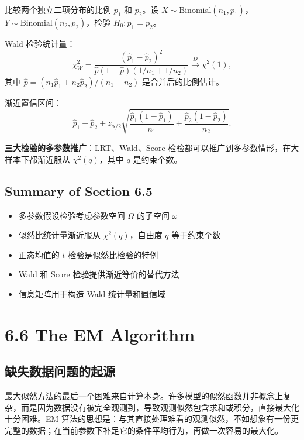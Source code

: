 \begin{example}[二项比例的检验]\label{ex:binomial-proportion-test}
比较两个独立二项分布的比例 $p_1$ 和 $p_2$。设 $X \sim \text{Binomial}(n_1, p_1)$，$Y \sim \text{Binomial}(n_2, p_2)$，检验 $H_0: p_1 = p_2$。

Wald 检验统计量：
\[
\chi_W^2 = \frac{(\widehat{p}_1 - \widehat{p}_2)^2}{\widehat{p}(1-\widehat{p})(1/n_1 + 1/n_2)} \xrightarrow{D} \chi^2(1),
\]
其中 $\widehat{p} = (n_1\widehat{p}_1 + n_2\widehat{p}_2)/(n_1 + n_2)$ 是合并后的比例估计。

渐近置信区间：
\[
\widehat{p}_1 - \widehat{p}_2 \pm z_{\alpha/2}\sqrt{\frac{\widehat{p}_1(1-\widehat{p}_1)}{n_1} + \frac{\widehat{p}_2(1-\widehat{p}_2)}{n_2}}.
\]
\end{example}

\begin{remark}
\textbf{三大检验的多参数推广}：LRT、Wald、Score 检验都可以推广到多参数情形，在大样本下都渐近服从 $\chi^2(q)$，其中 $q$ 是约束个数。
\end{remark}

\subsection{Summary of Section 6.5}

\begin{itemize}
\item 多参数假设检验考虑参数空间 $\Omega$ 的子空间 $\omega$
\item 似然比统计量渐近服从 $\chi^2(q)$，自由度 $q$ 等于约束个数
\item 正态均值的 $t$ 检验是似然比检验的特例
\item Wald 和 Score 检验提供渐近等价的替代方法
\item 信息矩阵用于构造 Wald 统计量和置信域
\end{itemize}

\section{6.6 The EM Algorithm}\label{sec:6.6}

\subsection{缺失数据问题的起源}

最大似然方法的最后一个困难来自计算本身。许多模型的似然函数并非概念上复杂，而是因为数据没有被完全观测到，导致观测似然包含求和或积分，直接最大化十分困难。EM 算法的思想是：与其直接处理难看的观测似然，不如想象有一份更完整的数据；在当前参数下补足它的条件平均行为，再做一次容易的最大化。

